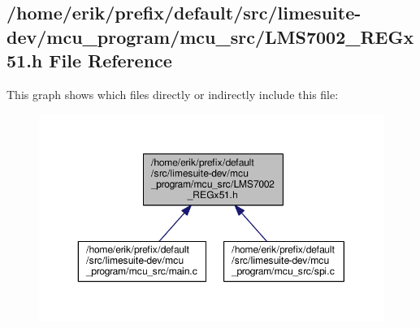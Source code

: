 \subsection{/home/erik/prefix/default/src/limesuite-\/dev/mcu\+\_\+program/mcu\+\_\+src/\+L\+M\+S7002\+\_\+\+R\+E\+Gx51.h File Reference}
\label{LMS7002__REGx51_8h}
This graph shows which files directly or indirectly include this file\+:
\nopagebreak
\begin{figure}[H]
\begin{center}
\leavevmode
\includegraphics[width=350pt]{d7/d09/LMS7002__REGx51_8h__dep__incl}
\end{center}
\end{figure}
